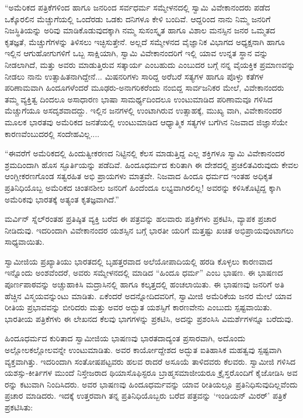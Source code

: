 “ಅಮೆರಿಕದ ಪತ್ರಿಕೆಗಳಿಂದ ಹಾಗೂ ಜನರಿಂದ ಸರ್ವಧರ್ಮ ಸಮ್ಮೇಳನದಲ್ಲಿ ಸ್ವಾಮಿ ವಿವೇಕಾನಂದರು ಪಡೆದ ಒಕ್ಕೊರಲಿನ ಮೆಚ್ಚುಗೆಯಲ್ಲಿ ಒಂದೆರಡು ಒಡಕು ದನಿಗಳೂ ಕೇಳಿ ಬಂದಿವೆ. ಆದ್ದರಿಂದ ನಾನು ನಿಮ್ಮ ಜನರಿಗೆ ನಿಜಸ್ಥಿತಿಯನ್ನು ಅರಿವು ಮಾಡಿಕೊಡುವುದಕ್ಕಾಗಿ ನಮ್ಮ ಸುಸಂಸ್ಕೃತ ಹಾಗೂ ವಿಶಾಲ ಮನಸ್ಸಿನ ಜನರ ಒಮ್ಮತದ ಕೃತಜ್ಞತೆ, ಮೆಚ್ಚುಗೆಗಳನ್ನು ತಿಳಿಸಲು ಇಚ್ಛಿಸುತ್ತೇನೆ. ಅಲ್ಲದೆ ಸಮ್ಮೇಳನದ ವೈಜ್ಞಾನಿಕ ವಿಭಾಗದ ಅಧ್ಯಕ್ಷನಾಗಿ ಹಾಗೂ ಇಲ್ಲಿನ ಆಗುಹೋಗುಗಳಿಗೆ ಒಬ್ಬ ಸಾಕ್ಷಿಯಾಗಿ, ಸ್ವಾಮಿ ವಿವೇಕಾನಂದರಿಗೆ ಇಲ್ಲಿ ಯಾವ ಉನ್ನತ ಸ್ಥಾನ ವನ್ನು ನೀಡಲಾಗಿದೆ, ಮತ್ತು ಅವರು ಮಾಡುತ್ತಿರುವ ಸತ್ಕಾರ್ಯ ಎಂಬಹುದು ಎಂಬುದರ ಬಗ್ಗೆ ನನ್ನ ವೈಯಕ್ತಿಕ ಪ್ರಮಾಣವನ್ನು ನೀಡಲು ನಾನು ಉತ್ಸಾಹಿತನಾಗಿದ್ದೇನೆ... ಮಿಷನರಿಗಳು ಸಾರಿದ್ದ ಅರೆಬರೆ ಸತ್ಯಗಳ ಹಾಗೂ ಪೊಳ್ಳು ಕತೆಗಳ ಪರಿಣಾಮವಾಗಿ ಹಿಂದೂಗಳೆಂದರೆ ಮೂಢರು-ಅನಾಗರಿಕರೆಂದು ನಂಬಿದ್ದ ಸಾರ್ವಜನಿಕರ ಮೇಲೆ, ವಿವೇಕಾನಂದರು ತಮ್ಮ ವ್ಯಕ್ತಿತ್ವ ದಿಂದಲೂ ಅಸಾಧಾರಣ ಭಾಷಾ ಸಾಮರ್ಥ್ಯದಿಂದಲೂ ಉಂಟುಮಾಡಿದ ಪರಿಣಾಮವೂ ಗಳಿಸಿದ ಮೆಚ್ಚುಗೆಯೂ ಅಸದೃಶವಾದದ್ದು. ಇಲ್ಲಿನ ಜನಗಳಲ್ಲಿ ಉಂಟಾಗಿರುವ ಉತ್ಸಾಹಕ್ಕೆ, ಮುಖ್ಯ ವಾಗಿ, ವಿವೇಕಾನಂದರ ಮೂಲಕ ಭಾರತವು ಅಮೆರಿಕದ ಜನತೆಯಲ್ಲಿ ಉಂಟುಮಾಡಿದ ಆಧ್ಯಾತ್ಮಿಕ ಸತ್ಯಗಳ ಬಗೆಗಿನ ನಿಜವಾದ ಜಿಜ್ಞಾಸೆಯೇ ಕಾರಣವೆಂಬುದರಲ್ಲಿ ಸಂದೇಹವಿಲ್ಲ....

“ಈವರೆಗೆ ಅಮೆರಿಕದಲ್ಲಿ ಹಿಂದುತ್ವೀಕರಣದ ನಿಟ್ಟಿನಲ್ಲಿ ಕೆಲಸ ಮಾಡುತ್ತಿದ್ದ ಎಲ್ಲ ಶಕ್ತಿಗಳೂ ಸ್ವಾಮಿ ವಿವೇಕಾನಂದರ ಶ್ರಮದಿಂದಾಗಿ ಹೊಸ ಸ್ಫೂರ್ತಿಯನ್ನು ಪಡೆದಿವೆ. ಹಿಂದೂಧರ್ಮದ ಕುರಿತಾಗಿ ಈ ದೇಶದಲ್ಲಿ ಪ್ರಚಲಿತವಿರುವುದು ಕೇವಲ ಆಂಗ್ಲೀಕರಣಗೊಂಡ ಸತ್ವರಹಿತ ಅಭಿ ಪ್ರಾಯಗಳು ಮಾತ್ರವೇ. ನಿಜವಾದ ಹಿಂದೂ ಧರ್ಮದ ಇಂತಹ ಅಧಿಕೃತ ಪ್ರತಿನಿಧಿಯೊಬ್ಬ ಅಮೆರಿಕದ ಚಿಂತನಶೀಲ ಜನರಿಗೆ ಹಿಂದೆಂದೂ ಲಭ್ಯವಾಗಿರಲಿಲ್ಲ! ಅವರನ್ನು ಕಳಿಸಿಕೊಟ್ಟಿದ್ದ ಕ್ಕಾಗಿ ಅಮೆರಿಕವು ಭಾರತಕ್ಕೆ ಅತ್ಯಂತ ಕೃತಜ್ಞವಾಗಿದೆ.”

ಮರ್ವಿನ್ ಸ್ನೆಲ್​ರಂತಹ ಪ್ರತಿಷ್ಠಿತ ವ್ಯಕ್ತಿ ಬರೆದ ಈ ಪತ್ರವನ್ನು ಹಲವಾರು ಪತ್ರಿಕೆಗಳು ಪ್ರಕಟಿಸಿ, ವ್ಯಾಪಕ ಪ್ರಚಾರ ನೀಡಿದುವು. ಇದರಿಂದಾಗಿ ವಿವೇಕಾನಂದರ ಯಶಸ್ಸಿನ ಬಗ್ಗೆ ಭಾರತೀ ಯರಿಗೆ ಮತ್ತಷ್ಟು ಖಚಿತ ಅಭಿಪ್ರಾಯವುಂಟಾಗಲು ಸಾಧ್ಯವಾಯಿತು.

ಸ್ವಾಮೀಜಿಯ ಪ್ರಖ್ಯಾತಿಯು ಭಾರತದಲ್ಲಿ ಬೃಹತ್ತರವಾದ ಅಲೆಯೋಪಾದಿಯಲ್ಲಿ ಹರಡಿ ಕೊಳ್ಳಲು ಕಾರಣವಾದ ಇನ್ನೊಂದು ಅಂಶವೆಂದರೆ, ಅವರು ಸಮ್ಮೇಳನದಲ್ಲಿ ಮಾಡಿದ “ಹಿಂದೂ ಧರ್ಮ” ಎಂಬ ಭಾಷಣ. ಈ ಭಾಷಣದ ಪೂರ್ಣಪಾಠವನ್ನು ಅಚ್ಚುಹಾಕಿಸಿ ಮದ್ರಾಸಿನಲ್ಲಿ ಹಾಗೂ ಕಲ್ಕತ್ತದಲ್ಲಿ ಹಂಚಲಾಯಿತು. ಈ ಭಾಷಣವು ಜನರಿಗೆ ಅತಿ ಹೆಚ್ಚಿನ ವಿಸ್ಮಯವನ್ನುಂಟು ಮಾಡಿತು. ಏಕೆಂದರೆ ಅದನ್ನೋದಿದವರಿಗೆ, ಸ್ವಾಮೀಜಿ ಅಮೆರಿಕೆಯ ಜನರ ಮೇಲೆ ಯಾವ ರೀತಿಯ ಪ್ರಭಾವವನ್ನು ಬೀರಿದರು ಮತ್ತು ಅವರ ಅದ್ಭುತ ಯಶಸ್ಸಿಗೆ ಕಾರಣವೇನು ಎಂಬುದು ಸ್ಪಷ್ಟವಾಯಿತು. ಭಾರತೀಯ ಪತ್ರಿಕೆಗಳು ಈ ಲೇಖನದ ಕೆಲವು ಭಾಗಗಳನ್ನು ಪ್ರಕಟಿಸಿ, ಅದನ್ನು ಪ್ರಶಂಸಿಸಿ ವಿಮರ್ಶೆಗಳನ್ನೂ ಬರೆದುವು.

ಹಿಂದೂಧರ್ಮದ ಕುರಿತಾದ ಸ್ವಾಮೀಜಿಯ ಭಾಷಣವು ಭಾರತದಾದ್ಯಂತ ಪ್ರಸಾರವಾಗಿ, ಅದೊಂದು ಅಲ್ಲೋಲಕಲ್ಲೋಲವನ್ನೇ ಉಂಟುಮಾಡಿತು. ಅವರ ಕಾರ್ಯೋದ್ದೇಶದ ಅದ್ಭುತ ಐತಿಹಾಸಿಕ ಮಹತ್ವವು ಸ್ಪಷ್ಟವಾಗಿ ವ್ಯಕ್ತವಾಗಿತ್ತು. ಇದರಿಂದಾಗಿ ಸಂತೋಷಪಟ್ಟವರು ಹಲವ ರಾದರೆ ಅಸೂಯೆ ತಾಳಿದವರು ಕೆಲವರು. ಸ್ವಾಮೀಜಿ ಗಳಿಸಿದ ಯಶಸ್ಸು-ಕೀರ್ತಿಗಳ ಮುಂದೆ ನಿಸ್ತೇಜರಾದ ಥಿಯಾಸೊಫಿಸ್ಟರೂ ಬ್ರಾಹ್ಮಸಮಾಜೀಯರೂ ಕ್ರೈಸ್ತರೊಂದಿಗೆ ಕೈಜೋಡಿಸಿ ಅವ ರನ್ನು ಕಟುವಾಗಿ ನಿಂದಿಸಿದರು. ಅವರ ಭಾಷಣವು ಹಿಂದೂಧರ್ಮವನ್ನು ಯಾವ ರೀತಿಯಲ್ಲೂ ಪ್ರತಿನಿಧಿಸುವುದಿಲ್ಲವೆಂದು ಪ್ರಚಾರ ಮಾಡಿದರು. ಇದಕ್ಕೆ ಉತ್ತರವಾಗಿ ತನ್ನ ಪ್ರತಿನಿಧಿಯೊಬ್ಬರು ಬರೆದ ಪತ್ರವನ್ನು ‘ಇಂಡಿಯನ್ ಮಿರರ್​’ ಪತ್ರಿಕೆ ಪ್ರಕಟಿಸಿತು:

